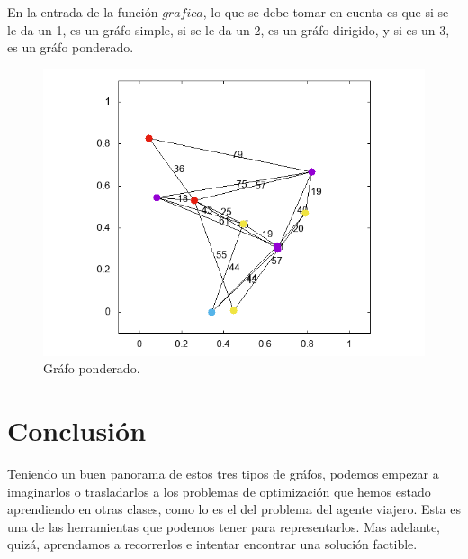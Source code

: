 \documentclass{article}%
\begin{document}
En la entrada de la funci\'on $grafica$, lo que se debe tomar en cuenta es que si se le da un 1, es un gr\'afo simple, si se le da un 2, es un gr\'afo dirigido, y si es un 3, es un gr\'afo ponderado.
\begin{figure}[h]

\centering
\includegraphics[width = 1\textwidth]{nodos1.png}

\caption{Gr\'afo ponderado.}
\end{figure}

\section*{Conclusi\'on}

Teniendo un buen panorama de estos tres tipos de gr\'afos, podemos empezar a imaginarlos o trasladarlos a los problemas de optimizaci\'on que hemos estado aprendiendo en otras clases, como lo es el del problema del agente viajero. Esta es una de las herramientas que podemos tener para representarlos. Mas adelante, quiz\'a, aprendamos a recorrerlos e intentar encontrar una soluci\'on factible.
\end{document}
